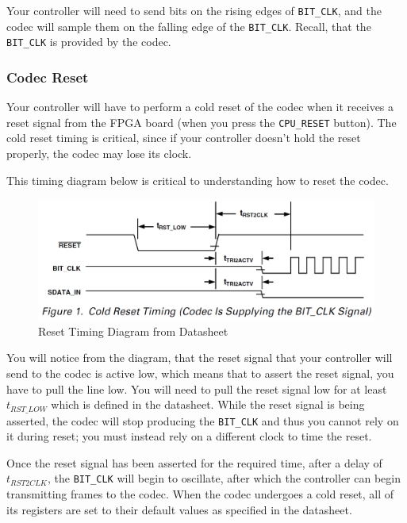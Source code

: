 \documentclass[11pt]{article}
\begin{document}
Your controller will need to send bits on the rising edges of \verb|BIT_CLK|, and the codec will sample them on the falling edge of the \verb|BIT_CLK|. Recall, that the \verb|BIT_CLK| is provided by the codec.

\subsubsection{Codec Reset}
Your controller will have to perform a cold reset of the codec when it receives a reset signal from the FPGA board (when you press the \verb|CPU_RESET| button). The cold reset timing is critical, since if your controller doesn't hold the reset properly, the codec may lose its clock.

This timing diagram below is critical to understanding how to reset the codec.

\begin{figure}[hbt]
	\begin{center}
		\includegraphics[width=5in]{ac97_codec_timing}
		\caption{Reset Timing Diagram from Datasheet}
	\end{center}
\end{figure}

You will notice from the diagram, that the reset signal that your controller will send to the codec is active low, which means that to assert the reset signal, you have to pull the line low. You will need to pull the reset signal low for at least $t_{RST\_LOW}$ which is defined in the datasheet. While the reset signal is being asserted, the codec will stop producing the \verb|BIT_CLK| and thus you cannot rely on it during reset; you must instead rely on a different clock to time the reset.

Once the reset signal has been asserted for the required time, after a delay of $t_{RST2CLK}$, the \verb|BIT_CLK| will begin to oscillate, after which the controller can begin transmitting frames to the codec. When the codec undergoes a cold reset, all of its registers are set to their default values as specified in the datasheet.
\end{document}
